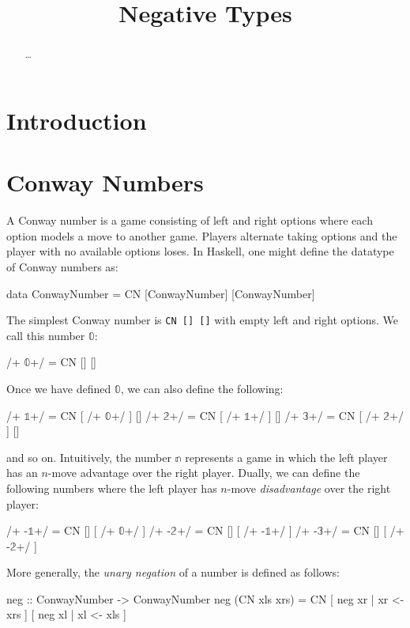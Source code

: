 \documentclass[authoryear,preprint]{sigplanconf}
\newcommand{\zerog}{$\mathbb{0}$}
\newcommand{\oneg}{$\mathbb{1}$}
\newcommand{\twog}{$\mathbb{2}$}
\newcommand{\threeg}{$\mathbb{3}$}
\begin{document}
\title{Negative Types}
\authorinfo{}{}{}
\maketitle

\begin{abstract}
\ldots
\end{abstract}

\section{Introduction}

\section{Conway Numbers}

A Conway number is a game consisting of left and right options where each
option models a move to another game. Players alternate taking options and
the player with no available options loses. In Haskell, one might define the
datatype of Conway numbers as:
\begin{code}
data ConwayNumber = CN [ConwayNumber] [ConwayNumber]
\end{code}
The simplest Conway number is \lstinline|CN [] []| with empty left and right
options. We call this number \zerog: 
\begin{code}
/+ \zerog +/  = CN  [] []
\end{code}
Once we have defined \zerog, we can also define the following:
\begin{code}
/+ \oneg +/  = CN  [ /+ \zerog +/ ]  []
/+ \twog +/  = CN  [ /+ \oneg +/ ]  []
/+ \threeg +/  = CN  [ /+ \twog +/ ]  []
\end{code}
and so on. Intuitively, the number $\mathbb{n}$ represents a game in which
the left player has an $n$-move advantage over the right player. Dually, we
can define the following numbers where the left player has $n$-move
\emph{disadvantage} over the right player:
\begin{code}
/+ -\oneg +/  = CN  [] [ /+ \zerog +/ ]
/+ -\twog +/  = CN  [] [ /+ -\oneg +/ ]
/+ -\threeg +/  = CN  [] [ /+ -\twog +/ ]
\end{code}
More generally, the \emph{unary negation} of a number is defined as follows:
\begin{code}
neg :: ConwayNumber -> ConwayNumber
neg (CN xls xrs) = 
  CN [ neg xr | xr <- xrs ] [ neg xl | xl <- xls ]
\end{code}
\end{document}
